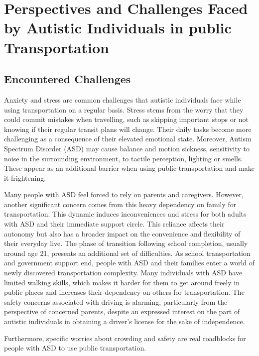 \section{Perspectives and Challenges Faced by Autistic Individuals in public Transportation}

\subsection{Encountered Challenges}

Anxiety and stress are common challenges that autistic individuals face while using transportation on a regular basis\cite{2020ExperiencesYoungAutistic}. Stress stems from the worry that they could commit mistakes when travelling, such as skipping important stops or not knowing if their regular transit plans will change. Their daily tasks become more challenging as a consequence of their elevated emotional state.  Moreover, Autism Spectrum Disorder (ASD) may cause balance and motion sickness, sensitivity to noise in the surrounding environment, to tactile perception, lighting or smells. These appear as an additional barrier when using public transportation and make it frightening.

Many people with ASD feel forced to rely on parents and caregivers. However, another significant concern comes from this heavy dependency on family for transportation. This dynamic induces inconveniences and stress for both adults with ASD and their immediate support circle\cite{2015DetourRightPlace}. This reliance affects their autonomy but also has a broader impact on the convenience and flexibility of their everyday live. The phase of transition following school completion, usually around age 21, presents an additional set of difficulties. As school transportation and government support end,  people with ASD and their families enter a world of newly discovered transportation complexity. Many individuals with ASD have limited walking skills, which makes it harder for them to get around freely in public places and increases their dependency on others for transportation. The safety concerns associated with driving is alarming, particularly from the perspective of concerned parents, despite an expressed interest on the part of autistic individuals in obtaining a driver's license for the sake of independence. 

Furthermore, specific worries about crowding and safety are real roadblocks for people with ASD to use public transportation\cite{2015ViewpointsAdultsAutism}.  

